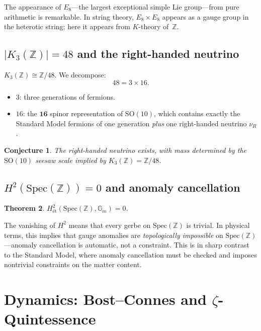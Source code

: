 \documentclass[12pt,a4paper]{article}
\newtheorem{theorem}{Theorem}[section]
\newtheorem{conjecture}[theorem]{Conjecture}
\theoremstyle{definition}
\newcommand{\Spec}{\mathrm{Spec}}
\newcommand{\Z}{\mathbb{Z}}
\begin{document}
The appearance of $E_8$---the largest exceptional simple Lie group---from
pure arithmetic is remarkable.  In string theory, $E_8\times E_8$ appears
as a gauge group in the heterotic string; here it appears from $K$-theory of~$\Z$.

\subsection{$|K_3(\Z)|=48$ and the right-handed neutrino}

$K_3(\Z)\cong\Z/48$.  We decompose:
\[
  48=3\times 16.
\]
\begin{itemize}
\item $3$: three generations of fermions.
\item $16$: the $\mathbf{16}$ spinor representation of $\mathrm{SO}(10)$, which
  contains exactly the Standard Model fermions of one generation \emph{plus}
  one right-handed neutrino $\nu_R$.
\end{itemize}

\begin{conjecture}
The right-handed neutrino exists, with mass determined by the $\mathrm{SO}(10)$
seesaw scale implied by $K_3(\Z)=\Z/48$.
\end{conjecture}

\subsection{$H^2(\Spec(\Z))=0$ and anomaly cancellation}

\begin{theorem}
$H^2_{\text{\'et}}(\Spec(\Z),\mathbb{G}_m)=0$.
\end{theorem}

The vanishing of $H^2$ means that every gerbe on $\Spec(\Z)$ is trivial.
In physical terms, this implies that gauge anomalies are \emph{topologically
impossible} on $\Spec(\Z)$---anomaly cancellation is automatic, not a constraint.
This is in sharp contrast to the Standard Model, where anomaly cancellation
must be checked and imposes nontrivial constraints on the matter content.

\section{Dynamics: Bost--Connes and $\zeta$-Quintessence}\label{sec:dynamics}
\end{document}
